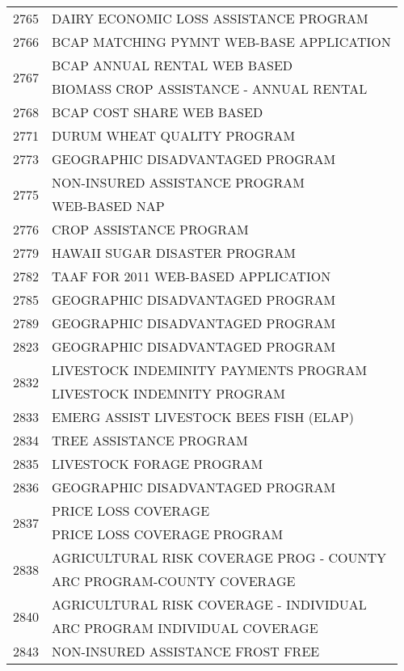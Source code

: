 \begin{longtable}{ll}
\cline{1-2}
2765 & DAIRY ECONOMIC LOSS ASSISTANCE PROGRAM \\
\cline{1-2}
2766 & BCAP MATCHING PYMNT WEB-BASE APPLICATION \\
\cline{1-2}
\multirow[t]{2}{*}{2767} & BCAP ANNUAL RENTAL WEB BASED \\
 & BIOMASS CROP ASSISTANCE - ANNUAL RENTAL \\
\cline{1-2}
2768 & BCAP COST SHARE WEB BASED \\
\cline{1-2}
2771 & DURUM WHEAT QUALITY PROGRAM \\
\cline{1-2}
2773 & GEOGRAPHIC DISADVANTAGED PROGRAM \\
\cline{1-2}
\multirow[t]{2}{*}{2775} & NON-INSURED ASSISTANCE PROGRAM \\
 & WEB-BASED NAP \\
\cline{1-2}
2776 & CROP ASSISTANCE PROGRAM \\
\cline{1-2}
2779 & HAWAII SUGAR DISASTER PROGRAM \\
\cline{1-2}
2782 & TAAF FOR 2011 WEB-BASED APPLICATION \\
\cline{1-2}
2785 & GEOGRAPHIC DISADVANTAGED PROGRAM \\
\cline{1-2}
2789 & GEOGRAPHIC DISADVANTAGED PROGRAM \\
\cline{1-2}
2823 & GEOGRAPHIC DISADVANTAGED PROGRAM \\
\cline{1-2}
\multirow[t]{2}{*}{2832} & LIVESTOCK INDEMINITY PAYMENTS PROGRAM \\
 & LIVESTOCK INDEMNITY PROGRAM \\
\cline{1-2}
2833 & EMERG ASSIST LIVESTOCK BEES FISH (ELAP) \\
\cline{1-2}
2834 & TREE ASSISTANCE PROGRAM \\
\cline{1-2}
2835 & LIVESTOCK FORAGE PROGRAM \\
\cline{1-2}
2836 & GEOGRAPHIC DISADVANTAGED PROGRAM \\
\cline{1-2}
\multirow[t]{2}{*}{2837} & PRICE LOSS COVERAGE \\
 & PRICE LOSS COVERAGE PROGRAM \\
\cline{1-2}
\multirow[t]{2}{*}{2838} & AGRICULTURAL RISK COVERAGE PROG - COUNTY \\
 & ARC PROGRAM-COUNTY COVERAGE \\
\cline{1-2}
\multirow[t]{2}{*}{2840} & AGRICULTURAL RISK COVERAGE - INDIVIDUAL \\
 & ARC PROGRAM INDIVIDUAL COVERAGE \\
\cline{1-2}
2843 & NON-INSURED ASSISTANCE FROST FREE \\

\end{longtable}
